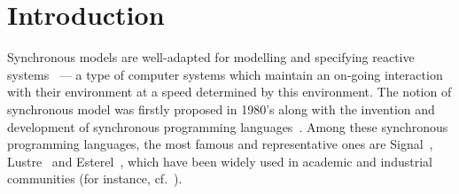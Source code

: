 \documentclass{fcs}
\begin{document}
\section{Introduction}
\label{section:Introduction}

\noindent Synchronous models are well-adapted for modelling and specifying reactive systems~\cite{Harel85} --- a type of computer systems which maintain an on-going interaction with their environment at a speed determined by this environment.
The notion of synchronous model was firstly proposed in 1980's along with the invention and development of synchronous programming languages~\cite{Benveniste03}.
Among these synchronous programming languages,
the most famous and representative ones are Signal~\cite{Benveniste91}, Lustre~\cite{Halbwachs91} and Esterel~\cite{Berry92}, which have been widely used in academic and industrial communities (for instance, cf.~\cite{Espiau90,Berry00,Gamatie04,Qian15}).

\fi
\end{document}
